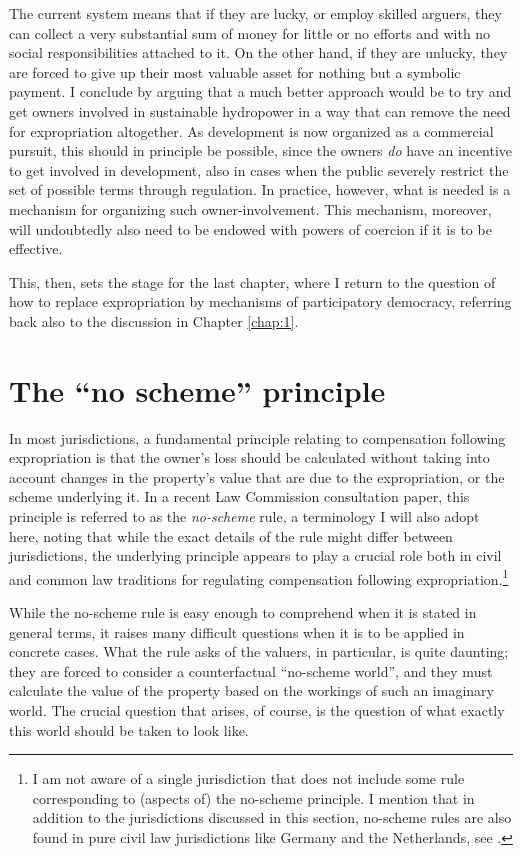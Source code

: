 The current system means that if they are lucky, or employ skilled arguers, they can collect a very substantial sum of money for little or no efforts and with no social responsibilities attached to it. On the other hand, if they are unlucky, they are forced to give up their most valuable asset for nothing but a symbolic payment. I conclude by arguing that a much better approach would be to try and get owners involved in sustainable hydropower in a way that can remove the need for expropriation altogether. As development is now organized as a commercial pursuit, this should in principle be possible, since the owners {\it do} have an incentive to get involved in  development, also in cases when the public severely restrict the set of possible terms through regulation.  In practice, however, what is needed is a mechanism for organizing such owner-involvement. This mechanism, moreover, will undoubtedly also need to be endowed with powers of coercion if it is to be effective.

This, then, sets the stage for the last chapter, where I return to the question of how to replace expropriation by mechanisms of participatory democracy, referring back also to the discussion in Chapter \ref{chap:1}.

\section{The ``no scheme'' principle}\label{sec:nsp}

In most jurisdictions, a fundamental principle relating to compensation following expropriation is that the owner's loss should be calculated without taking into account changes in the property's value that are due to the expropriation, or the scheme underlying it. In a recent Law Commission consultation paper, this principle is referred to as the \emph{no-scheme} rule, a terminology I will also adopt here, noting that while the exact details of the rule might differ between jurisdictions, the underlying principle appears to play a crucial role both in civil and common law traditions for regulating compensation following expropriation.\footnote{I am not aware of a single jurisdiction that does not include some rule corresponding to (aspects of) the no-scheme principle. I mention that in addition to the jurisdictions discussed in this section, no-scheme rules are also found in pure civil law jurisdictions like Germany and the Netherlands, see \cite[5,21]{sluysmans14}.}

While the no-scheme rule is easy enough to comprehend when it is stated in general terms, it raises many difficult questions when it is to be applied in concrete cases. What the rule asks of the valuers, in particular, is quite daunting; they are forced to consider a counterfactual ``no-scheme world'', and they must calculate the value of the property based on the workings of such an imaginary world. The crucial question that arises, of course, is the question of what exactly this world should be taken to look like.


